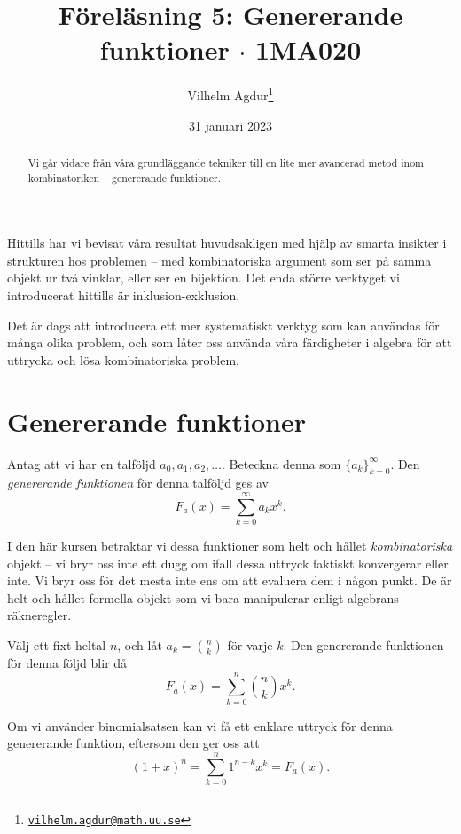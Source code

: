 \documentclass[nobib]{tufte-handout}
\title{Föreläsning 5: Genererande funktioner $\cdot$ 1MA020}
\author[Vilhelm Agdur]{Vilhelm Agdur\thanks{\href{mailto:vilhelm.agdur@math.uu.se}{\nolinkurl{vilhelm.agdur@math.uu.se}}}}
\date{31 januari 2023}
\begin{document}

\maketitle%

\begin{abstract}
\noindent
Vi går vidare från våra grundläggande tekniker till en lite mer avancerad metod inom kombinatoriken -- genererande funktioner.
\end{abstract}

Hittills har vi bevisat våra resultat huvudsakligen med hjälp av smarta insikter i strukturen hos problemen -- med kombinatoriska argument som ser på samma objekt ur två vinklar, eller ser en bijektion. Det enda större verktyget vi introducerat hittills är inklusion-exklusion.

Det är dags att introducera ett mer systematiskt verktyg som kan användas för många olika problem, och som låter oss använda våra färdigheter i algebra för att uttrycka och lösa kombinatoriska problem.

\section{Genererande funktioner}

\begin{definition}
    Antag att vi har en talföljd $a_0, a_1, a_2, \ldots$. Beteckna denna som $\{a_k\}_{k=0}^\infty$. Den \emph{genererande funktionen} för denna talföljd ges av
    $$F_{a}(x) = \sum_{k=0}^{\infty} a_k x^k.$$
\end{definition}

I den här kursen betraktar vi dessa funktioner som helt och hållet \emph{kombinatoriska} objekt -- vi bryr oss inte ett dugg om ifall dessa uttryck faktiskt konvergerar eller inte. Vi bryr oss för det mesta inte ens om att evaluera dem i någon punkt. De är helt och hållet formella objekt som vi bara manipulerar enligt algebrans räkneregler.

\begin{example}
    Välj ett fixt heltal $n$, och låt $a_k = \binom{n}{k}$ för varje $k$. Den genererande funktionen för denna följd blir då
    $$F_a(x) = \sum_{k=0}^{n}\binom{n}{k}x^k.$$

    Om vi använder binomialsatsen kan vi få ett enklare uttryck för denna genererande funktion, eftersom den ger oss att
    $$(1+x)^n = \sum_{k= 0}^{n}1^{n-k}x^k = F_a(x).$$
\end{example}
\end{document}
